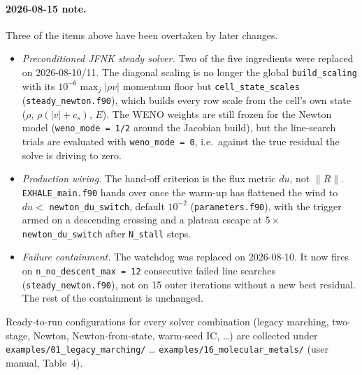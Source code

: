\documentclass[english,a4paper]{my_memo}
\begin{document}
\paragraph{2026-08-15 note.} Three of the items above have been overtaken by
later changes.
\begin{itemize}
\item \emph{Preconditioned JFNK steady solver.} Two of the five ingredients
  were replaced on 2026-08-10/11. The diagonal scaling is no longer the
  global \texttt{build\_scaling} with its $10^{-6}\max_j|\rho v|$ momentum
  floor but \texttt{cell\_state\_scales} (\texttt{steady\_newton.f90}), which
  builds every row scale from the cell's own state ($\rho$,
  $\rho(|v|+c_s)$, $E$). The WENO weights are still frozen for the Newton
  model (\texttt{weno\_mode = 1/2} around the Jacobian build), but the
  line-search trials are evaluated with \texttt{weno\_mode = 0}, i.e.\
  against the true residual the solve is driving to zero.
\item \emph{Production wiring.} The hand-off criterion is the flux metric
  $du$, not $\|R\|$. \texttt{EXHALE\_main.f90} hands over once the warm-up
  has flattened the wind to $du < $ \texttt{newton\_du\_switch}, default
  $10^{-2}$ (\texttt{parameters.f90}), with the trigger armed on a descending
  crossing and a plateau escape at $5\times$\,\texttt{newton\_du\_switch} after
  \texttt{N\_stall} steps.
\item \emph{Failure containment.} The watchdog was replaced on 2026-08-10. It
  now fires on \texttt{n\_no\_descent\_max = 12} consecutive failed line
  searches (\texttt{steady\_newton.f90}), not on 15 outer iterations without a
  new best residual. The rest of the
  containment is unchanged.
\end{itemize}

Ready-to-run configurations for every solver combination (legacy
marching, two-stage, Newton, Newton-from-state, warm-seed IC, \ldots) are
collected under \texttt{examples/01\_legacy\_marching/} \ldots
\texttt{examples/16\_molecular\_metals/} (user manual, Table~4).
\end{document}
